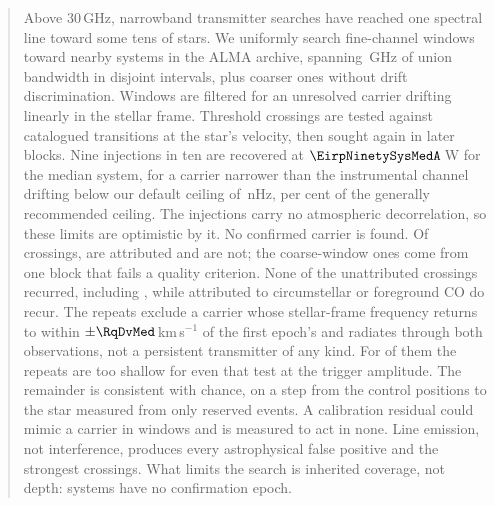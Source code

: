 \begin{abstract}
Above 30\,GHz, narrowband transmitter searches have reached one spectral line
toward some tens of stars.
We uniformly search \NWinA{} fine-channel windows toward \NSysClassA{} nearby
systems in the ALMA archive, spanning \CvUnionA\,GHz of union bandwidth in
disjoint intervals, plus \NWinB{} coarser ones without drift discrimination.
Windows are filtered for an unresolved carrier drifting linearly in the
stellar frame. Threshold crossings are tested against catalogued transitions
at the star's velocity, then sought again in later blocks.
Nine injections in ten are recovered at $\EirpNinetySysMedA$\,W for the median
system, for a carrier narrower than the instrumental channel drifting below
our default ceiling of \DriftCeilLo\,nHz, \AccelSheikhPct{} per cent of the
generally recommended ceiling. The injections carry no atmospheric
decorrelation, so these limits are optimistic by it.
No confirmed carrier is found. Of \EvNCrossRaw{} crossings, \MkAttr{} are
attributed and \MkUnattr{} are not; the \PrFlagXrossWord{} coarse-window ones
come from one block that fails a quality criterion.
None of the unattributed crossings recurred, including \PrRankClause, while
\MkAttrRecur{} attributed to circumstellar or foreground CO do recur. The
repeats exclude a carrier whose stellar-frame frequency returns to within
$\pm\RqDvMed$\,km\,s$^{-1}$ of the first epoch's and radiates through both
observations, not a persistent transmitter of any kind. For \RcNPowerLoTrig{}
of them the repeats are too shallow for even that test at the trigger
amplitude.
The remainder is consistent with chance, on a step from the control positions
to the star measured from only \StHoObs{} reserved events. A calibration
residual could mimic a carrier in \CxNAdmit{} windows and is measured to act
in none.
Line emission, not interference, produces every astrophysical false positive
and the strongest crossings. What limits the search is inherited coverage, not
depth: \RcNoRepSys{} systems have no confirmation epoch.
\end{abstract}


